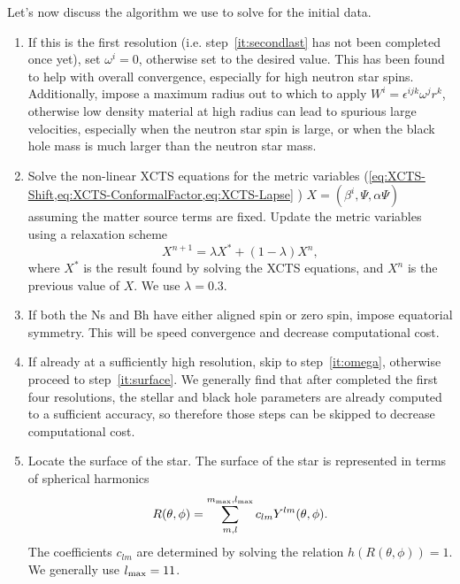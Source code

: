 Let's now discuss the algorithm we use to solve for the initial data. 

\begin{enumerate}
\item 
\label{it:1}
If this is the first resolution (i.e. step~\ref{it:secondlast} has not been
  completed once yet), set $\omega^i=0$, otherwise set
  to the desired value. This has been found to help with overall
  convergence, especially for high neutron star spins. Additionally, impose a maximum radius out to which to
  apply $W^i=\epsilon^{ijk}\omega^jr^k$, otherwise low density
  material at high radius can lead to spurious large velocities,
  especially when the neutron star spin is large, or when the black
  hole mass is much larger than the neutron star mass.

\item 
\label{it:solve}
Solve the non-linear XCTS equations for the metric variables (\cref{eq:XCTS-Shift,eq:XCTS-ConformalFactor,eq:XCTS-Lapse} )
  $X=\left(\beta^i,\Psi,\alpha\Psi\right)$ assuming the matter source
  terms are fixed. Update the metric variables using a relaxation
  scheme
\begin{equation}
\label{eq:Relaxation}
X^{n+1}=\lambda X^{*} + (1-\lambda)X^n,
\end{equation}
where $X^{*}$ is the result found by solving the XCTS equations, and $X^{n}$ is
the previous value of $X$.
We use $\lambda=0.3$.

\item If both the Ns and Bh have either aligned spin or zero spin,
  impose equatorial symmetry. This will be speed convergence and
  decrease computational cost.

\item
\label{it:toplevelparamsolve}
 If already at a sufficiently high resolution, skip to step~\ref{it:omega}, otherwise proceed to step~\ref{it:surface}. We generally find that after completed the first four resolutions, 
the stellar and black hole parameters are already computed to a sufficient accuracy, so therefore those steps can be skipped to decrease computational cost.

\item 
\label{it:surface}
Locate the surface of the star. The surface of the star is
  represented in terms of spherical harmonics
\begin{equation}
\label{eq:NSSurf}
R(\theta,\phi)=\sum_{m,l}^{m_{\rm max},l_{\rm max}} c_{lm}Y^{lm}(\theta,\phi)
.
\end{equation}
The coefficients $c_{lm}$ are determined by solving the relation $h\left(R\left(\theta,\phi\right)\right)=1$.
We generally use $l_{\rm max}=11$.


\end{enumerate}
